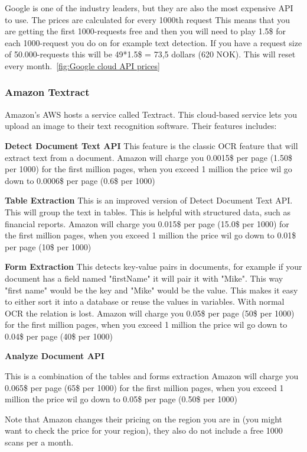 Google is one of the industry leaders, but they are also the most expensive API to use.
The prices are calculated for every 1000th request
This means that you are getting the first 1000-requests free and then you will need to play 1.5\$ for each 1000-request you do on for example text detection.
If you have a request size of 50.000-requests this will be 49*1.5\$ = 73,5 dollars (620 NOK).
This will reset every month.~\ref{fig:Google cloud API prices}

\subsubsection{Amazon Textract}\label{subsubsec:API_Amazon}

Amazon's AWS hosts a service called Textract.
This cloud-based service lets you upload an image to their text recognition software.
Their features includes:

\textbf{Detect Document Text API}
This feature is the classic OCR feature that will extract text from a document.
Amazon will charge you 0.0015\$ per page (1.50\$ per 1000) for the first million pages, when you exceed 1 million the price wil go down to
0.0006\$ per page (0.6\$ per 1000)

\textbf{Table Extraction}
This is an improved version of Detect Document Text API. This will group the text in tables.
This is helpful with structured data, such as financial reports.
Amazon will charge you 0.015\$ per page (15.0\$ per 1000) for the first million pages, when you exceed 1 million the price wil go down to
0.01\$ per page (10\$ per 1000)

\textbf{Form Extraction}
This detects key-value pairs in documents, for example if your document has a field named "firstName" it will pair
it with "Mike".
This way "first name" would be the key and "Mike" would be the value.
This makes it easy to either sort it into a database or reuse the values in variables.
With normal OCR the relation is lost.
Amazon will charge you 0.05\$ per page (50\$ per 1000) for the first million pages, when you exceed 1 million the price wil go down to
0.04\$ per page (40\$ per 1000)

\textbf{Analyze Document API}

This is a combination of the tables and forms extraction
Amazon will charge you 0.065\$ per page (65\$ per 1000) for the first million pages, when you exceed 1 million the price wil go down to
0.05\$ per page (0.50\$ per 1000)

Note that Amazon changes their pricing on the region you are in (you might want to check the price for your region), they also do not include a free 1000 scans per a month.

